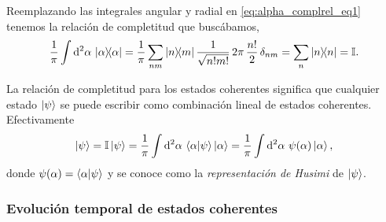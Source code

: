 \documentclass[10pt, a4paper]{article}
\numberwithin{equation}{subsection}
\begin{document}
Reemplazando las integrales angular y radial en \eqref{eq:alpha_complrel_eq1}
tenemos la relación de completitud que buscábamos,
\begin{equation}
  \frac{1}{\pi}\int\dd[2]{\alpha}\,\projector{\alpha} = 
  \frac{1}{\pi} \sum_{nm} \ketbra{n}{m} \frac{1}{\sqrt{n!m!}}\,
  2\pi\,\frac{n!}{2}\,\delta_{nm} = \sum_{n} \projector{n} = \Id.
\end{equation}

\bigbreak

La relación de completitud para los estados coherentes significa que cualquier
estado $\ket{\psi}$ se puede escribir como combinación lineal de estados
coherentes. Efectivamente
\begin{equation}
  \ket{\psi} = \mathbb{I}\ket{\psi} = \frac{1}{\pi} \int\dd[2]{\alpha}\,
  \braket{\alpha}{\psi}\ket{\alpha} = \frac{1}{\pi} \int\dd[2]{\alpha}\,
  \psi(\alpha)\ket{\alpha},
\end{equation}
donde $\psi(\alpha) = \braket{\alpha}{\psi}$ y se conoce como la
\emph{representación de Husimi} de $\ket{\psi}$.

\subsubsection{Evolución temporal de estados coherentes}
\end{document}

